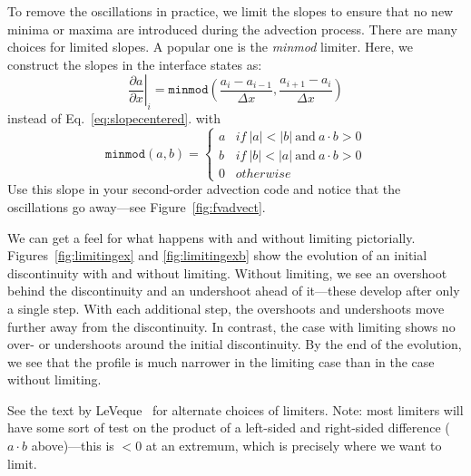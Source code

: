 \begin{exercise}
{To remove the oscillations in
practice, we limit the slopes to ensure that no new minima or maxima are
introduced during the advection process.  There are many choices for
limited slopes.  A popular one is the {\em minmod} limiter.  Here, we
construct the slopes in the interface states as:
\begin{equation}
\left . \frac{\partial a}{\partial x} \right |_i = \mathtt{minmod} \left (
  \frac{a_i - a_{i-1}}{\Delta x}, \frac{a_{i+1} - a_i}{\Delta x} \right )
\end{equation}
instead of Eq.~\ref{eq:slopecentered}.
with
\begin{equation}
\mathtt{minmod}(a,b) = \left \{
    \begin{array}{ll}
    a & \mathit{if~} |a| < |b| \mathrm{~and~} a\cdot b > 0 \\
    b & \mathit{if~} |b| < |a| \mathrm{~and~} a\cdot b > 0 \\
    0 & \mathit{otherwise}
    \end{array}
  \right .
\end{equation}
Use this slope in your second-order advection code and notice that the
oscillations go away---see Figure~\ref{fig:fvadvect}.}
\end{exercise}

We can get a feel for what happens with and without limiting
pictorially.  Figures~\ref{fig:limitingex} and
\ref{fig:limitingexb} show the evolution of an initial discontinuity
with and without limiting.  Without limiting, we see an overshoot
behind the discontinuity and an undershoot ahead of it---these develop
after only a single step.  With each additional step, the overshoots
and undershoots move further away from the discontinuity.  In
contrast, the case with limiting shows no over- or undershoots around
the initial discontinuity.  By the end of the evolution, we see that
the profile is much narrower in the limiting case than in the case
without limiting.

See the text by LeVeque~\cite{leveque:2002} for alternate choices of
limiters. Note: most limiters will have some sort of test on the
product of a left-sided and right-sided difference ($a\cdot b$
above)---this is $< 0$ at an extremum, which is precisely where we
want to limit.

